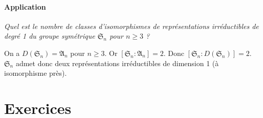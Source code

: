 \documentclass[french]{book}
\theoremstyle{definition}
\theoremstyle{remark}
\begin{document}
\paragraph{Application}

\emph{Quel est le nombre de classes d'isomorphismes de représentations irréductibles de degré 1 du groupe symétrique \(\mathfrak{S}_n\) pour \(n \geq 3\) ?}

On a \(D(\mathfrak{S}_n) = \mathfrak{A}_n\) pour \(n \geq 3\). Or \([\mathfrak{S}_n : \mathfrak{A}_n] = 2\). Donc \([\mathfrak{S}_n : D(\mathfrak{S}_n)]= 2\). \(\mathfrak{S}_n\) admet donc deux représentations irréductibles de dimension 1 (à isomorphisme près).

\section*{Exercices}
\end{document}
